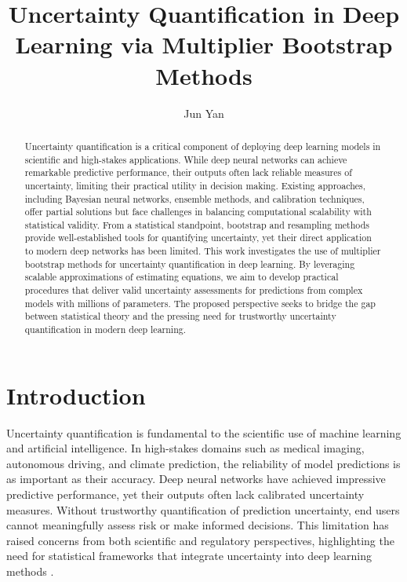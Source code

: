 \documentclass[12pt, titlepage, reqno]{article}
\title{Uncertainty Quantification in Deep Learning via Multiplier Bootstrap Methods}
\author[1]{Jun Yan}
\affil[1]{Department of Statistics, University of Connecticut, 
Storrs, CT 06269, USA}
\begin{document}
	
\maketitle
	
\begin{abstract}
Uncertainty quantification is a critical component of deploying deep
learning models in scientific and high-stakes applications. While deep
neural networks can achieve remarkable predictive performance, their
outputs often lack reliable measures of uncertainty, limiting their
practical utility in decision making. Existing approaches, including
Bayesian neural networks, ensemble methods, and calibration
techniques, offer partial solutions but face challenges in balancing
computational scalability with statistical validity. From a
statistical standpoint, bootstrap and resampling methods provide
well-established tools for quantifying uncertainty, yet their direct
application to modern deep networks has been limited. This work
investigates the use of multiplier bootstrap methods for uncertainty
quantification in deep learning. By leveraging scalable approximations
of estimating equations, we aim to develop practical procedures that
deliver valid uncertainty assessments for predictions from complex
models with millions of parameters. The proposed perspective seeks to
bridge the gap between statistical theory and the pressing need for
trustworthy uncertainty quantification in modern deep learning.


\bigskip
{}

\end{abstract}

\doublespacing

\section{Introduction}
\label{sec:intro}

Uncertainty quantification is fundamental to the scientific use of
machine learning and artificial intelligence. In high-stakes domains
such as medical imaging, autonomous driving, and climate prediction,
the reliability of model predictions is as important as their
accuracy. Deep neural networks have achieved impressive predictive
performance, yet their outputs often lack calibrated uncertainty
measures. Without trustworthy quantification of prediction uncertainty,
end users cannot meaningfully assess risk or make informed
decisions. This limitation has raised concerns from both scientific
and regulatory perspectives, highlighting the need for statistical
frameworks that integrate uncertainty into deep learning methods
\citep{kendall2017uncertainties, abdar2021review}.
\end{document}
